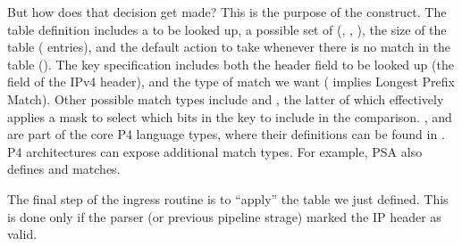 \documentclass[letterpaper,11pt,english]{sphinxmanual}
\begin{document}
But how does that decision get made? This is the purpose of the
 construct. The table definition includes a  to be
looked up, a possible set of  (, ,
), the size of the table ( entries), and the
default action to take whenever there is no match in the table
(). The key specification includes both the header field to be
looked up (the  field of the IPv4 header), and the type of
match we want ( implies Longest Prefix Match). Other possible
match types include  and , the latter of which
effectively applies a mask to select which bits in the key to include
in the comparison. ,  and  are part of the
core P4 language types, where their definitions can be found in
. P4 architectures can expose additional match types. For
example, PSA also defines  and  matches.

The final step of the ingress routine is to “apply” the table we just
defined. This is done only if the parser (or previous pipeline strage)
marked the IP header as valid.
\end{document}
